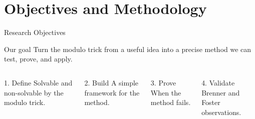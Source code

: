 \section{Objectives and Methodology}

\begin{frame}{Research Objectives}
    \begin{block}{Our goal}
        Turn the modulo trick from a useful idea into a precise method we can test, prove, and apply.
    \end{block}

    \vspace{0.15cm}
    \begin{columns}[T,onlytextwidth]
        \begin{exampleblock}{1. Define}
            \small Solvable and non-solvable by the modulo trick.
        \end{exampleblock}

        \begin{exampleblock}{2. Build}
            \small A simple framework for the method.
        \end{exampleblock}

        \begin{exampleblock}{3. Prove}
            \small When the method fails.
        \end{exampleblock}

        \begin{exampleblock}{4. Validate}
            \small Brenner and Foster observations.
        \end{exampleblock}
    \end{columns}
\end{frame}

